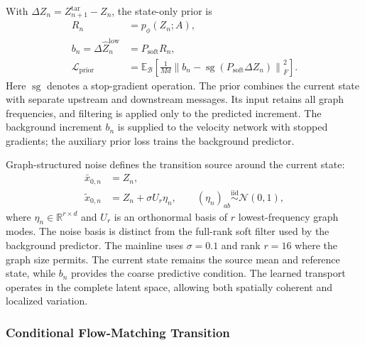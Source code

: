 With $\Delta Z_n=Z_{n+1}^{\mathrm{tar}}-Z_n$, the state-only prior is
\begin{equation}
 \begin{aligned}
 R_n&=p_\phi(Z_n;A),\\
 b_n=\Delta\widehat Z_n^{\mathrm{low}}
    &=P_{\mathrm{soft}}R_n,\\
 \mathcal L_{\mathrm{prior}}
   &=\mathbb E_{\mathcal B}\!\left[
       \frac{1}{Md}
       \left\|b_n-\operatorname{sg}
          (P_{\mathrm{soft}}\Delta Z_n)\right\|_F^2
      \right].
 \end{aligned}
 \label{eq:graph-prior-loss}
\end{equation}
Here $\operatorname{sg}$ denotes a stop-gradient operation.
The prior combines the current state with separate upstream and downstream
messages. Its input retains all graph frequencies, and filtering is
applied only to the predicted increment. The background increment $b_n$
is supplied to the velocity network with stopped gradients; the auxiliary
prior loss trains the background predictor.

Graph-structured noise defines the transition source around the current
state:
\begin{equation}
 \begin{aligned}
 \bar x_{0,n}&=Z_n,\\
 \tilde x_{0,n}&=Z_n+\sigma U_r\eta_n,
 \qquad (\eta_n)_{ab}\overset{\mathrm{iid}}{\sim}\mathcal N(0,1),
 \end{aligned}
 \label{eq:noisy-graph-prior}
\end{equation}
where $\eta_n\in\mathbb R^{r\times d}$ and $U_r$ is an orthonormal
basis of $r$ lowest-frequency graph modes. The noise basis is distinct
from the full-rank soft filter used by the background predictor.
The mainline uses $\sigma=0.1$ and rank $r=16$ where the graph size permits.
The current state remains the source mean and reference state, while
$b_n$ provides the coarse predictive condition. The learned transport
operates in the complete latent space, allowing both spatially coherent
and localized variation.

\subsubsection{Conditional Flow-Matching Transition}

